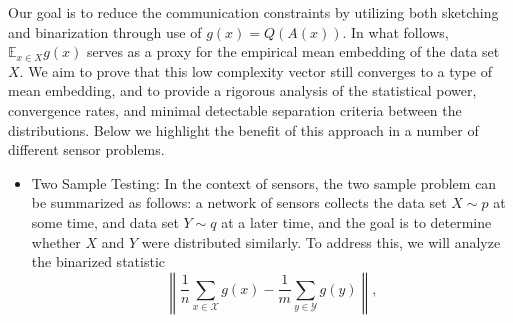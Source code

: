 \documentclass{article}
\newcommand{\comment}[3]{{\color{#1} {\bf #2 :} #3}}
\newcommand{\yoav}[1]{\comment{magenta}{Yoav}{#1}}
\begin{document}
Our goal is to reduce the communication constraints by utilizing both sketching and binarization through use of $g(x) = Q(A(x))$.  In what follows, $\mathbb{E}_{x\in X} g(x)$ serves as a proxy for the empirical mean embedding of the data set $X$.  We aim to prove that this low complexity vector still converges to a type of mean embedding, and to provide a rigorous analysis of the statistical power, convergence rates, and minimal detectable separation criteria between the distributions.  Below we highlight the benefit of this approach in a number of different sensor problems.

\begin{itemize}
\item Two Sample Testing: 
In the context of sensors, the two sample problem can be summarized as follows: a network of sensors collects the data set $X\sim p$ at some time, and data set $Y\sim q$ at a later time, and the goal is to determine whether $X$ and $Y$ were distributed similarly.  To address this, we will analyze the binarized statistic $$\left\|\frac{1}{n}\sum_{x\in \mathcal{X}} g(x) - \frac{1}{m}\sum_{y\in \mathcal{Y}} g(y)\right\|,$$

\end{itemize}
\end{document}
